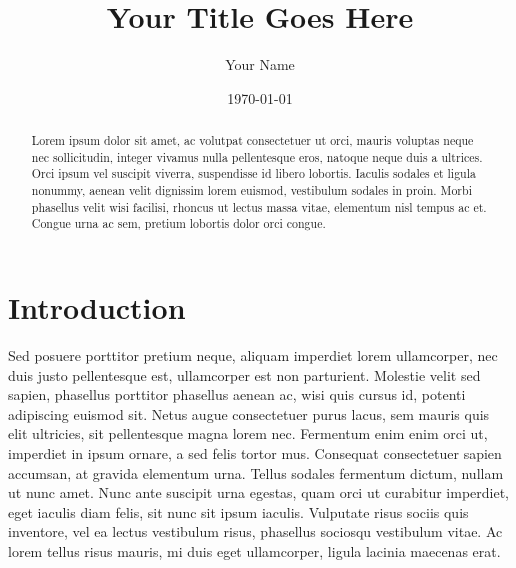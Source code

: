 \documentclass[twocolumn,prb,amsmath,amssymb,amsfonts]{revtex4}
\begin{document}
\title{Your Title Goes Here}

\author{Your Name}

\date{\today}

\begin{abstract}
Lorem ipsum dolor sit amet, ac volutpat consectetuer ut orci, mauris voluptas neque nec sollicitudin, integer vivamus nulla pellentesque eros, natoque neque duis a ultrices. Orci ipsum vel suscipit viverra, suspendisse id libero lobortis. Iaculis sodales et ligula nonummy, aenean velit dignissim lorem euismod, vestibulum sodales in proin. Morbi phasellus velit wisi facilisi, rhoncus ut lectus massa vitae, elementum nisl tempus ac et. Congue urna ac sem, pretium lobortis dolor orci congue. 
\end{abstract}

\maketitle
\section{Introduction}
Sed posuere porttitor pretium neque, aliquam imperdiet lorem ullamcorper, nec duis justo pellentesque est, ullamcorper est non parturient. Molestie velit sed sapien, phasellus porttitor phasellus aenean ac, wisi quis cursus id, potenti adipiscing euismod sit. Netus augue consectetuer purus lacus, sem mauris quis elit ultricies, sit pellentesque magna lorem nec. Fermentum enim enim orci ut, imperdiet in ipsum ornare, a sed felis tortor mus. Consequat consectetuer sapien accumsan, at gravida elementum urna. Tellus sodales fermentum dictum, nullam ut nunc amet. Nunc ante suscipit urna egestas, quam orci ut curabitur imperdiet, eget iaculis diam felis, sit nunc sit ipsum iaculis. Vulputate risus sociis quis inventore, vel ea lectus vestibulum risus, phasellus sociosqu vestibulum vitae. Ac lorem tellus risus mauris, mi duis eget ullamcorper, ligula lacinia maecenas erat.
\end{document}
